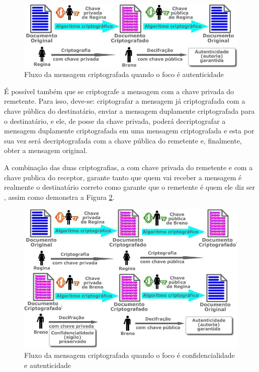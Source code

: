 \begin{figure}[H]
    \centering
    \caption{Fluxo da mensagem criptografada quando o foco é autenticidade}
    \label{fig:cripfocoauten}
    \includegraphics[width=.8\linewidth]{Figuras/Autencidade.png}
\end{figure}

É possível também que se criptografe a mensagem com a chave privada do remetente. Para isso, deve-se: criptografar a mensagem já criptografada com a chave pública do destinatário, enviar a mensagem duplamente criptografada para o destinatário, e ele, de posse da chave privada, poderá decriptografar a mensagem duplamente criptografada em uma mensagem criptografada e esta por sua vez será decriptografada com a chave pública do remetente e, finalmente, obter a mensagem original.

A combinação das duas criptografias, a com chave privada do remetente e com a chave publica do receptor, garante tanto que quem vai receber a mensagem é realmente o destinatário correto como garante que o remetente é quem ele diz ser \cite{stallings14} \cite{tanenbaum03}, assim como demonstra a Figura \ref{fig:cripfococonfieauten}.

\begin{figure}[H]
    \centering
    \caption{Fluxo da mensagem criptografada quando o foco é confidencialidade e autenticidade}
    \label{fig:cripfococonfieauten}
    \includegraphics[width=.8\linewidth]{Figuras/ConfidEAuten.png}
\end{figure}

